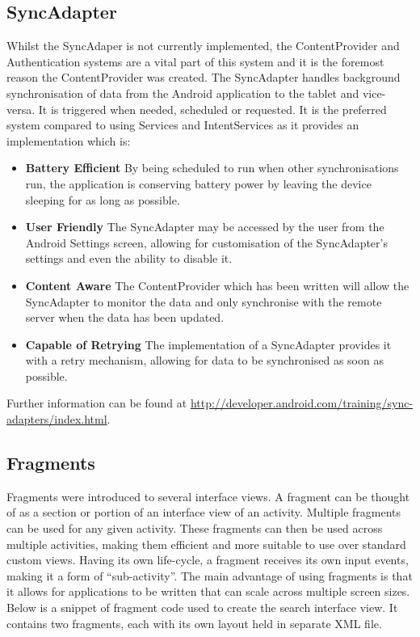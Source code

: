 \documentclass[11pt,a4paper]{article}
\begin{document}
\subsection{SyncAdapter}
\label{sec:syncAdapter}
Whilst the SyncAdaper is not currently implemented, the ContentProvider and Authentication systems are a vital part of this system and it is the foremost reason the ContentProvider was created. The SyncAdapter handles background synchronisation of data from the Android application to the tablet and vice-versa. It is triggered when needed, scheduled or requested. It is the preferred system compared to using Services and IntentServices as it provides an implementation which is:
\begin{itemize}
\item \textbf{Battery Efficient} By being scheduled to run when other synchronisations run, the application is conserving battery power by leaving the device sleeping for as long as possible.
\item \textbf{User Friendly} The SyncAdapter may be accessed by the user from the Android Settings screen, allowing for customisation of the SyncAdapter's settings and even the ability to disable it.
\item \textbf{Content Aware} The ContentProvider which has been written will allow the SyncAdapter to monitor the data and only synchronise with the remote server when the data has been updated.
\item \textbf{Capable of Retrying} The implementation of a SyncAdapter provides it with a retry mechanism, allowing for data to be synchronised as soon as possible.
\end{itemize}

Further information can be found at \url{http://developer.android.com/training/sync-adapters/index.html}.

\subsection{Fragments}
\label{sec:fragments}

Fragments were introduced to several interface views. A fragment can be thought of as a section or portion of an interface view of an activity. Multiple fragments can be used for any given activity. These fragments can then be used across multiple activities, making them efficient and more suitable to use over standard custom views. Having its own life-cycle, a fragment receives its own input events, making it a form of ``sub-activity''. The main advantage of using fragments is that it allows for applications to be written that can scale across multiple screen sizes. Below is a snippet of fragment code used to create the search interface view. It contains two fragments, each with its own layout held in separate XML file.\\
\end{document}
